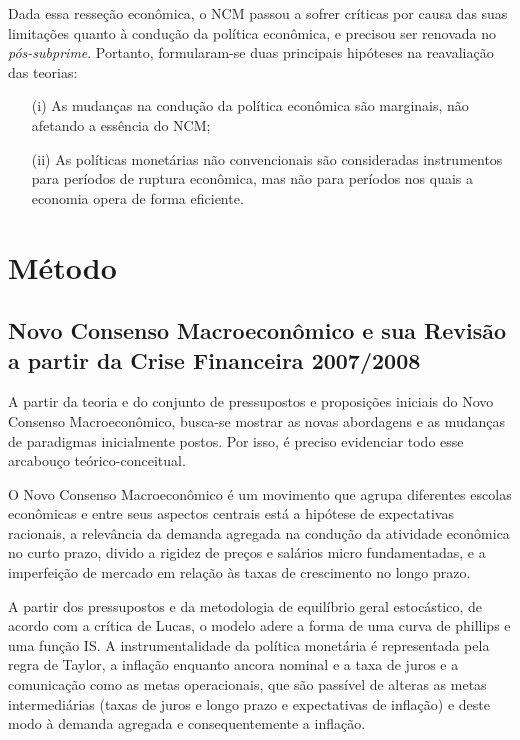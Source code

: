 \documentclass[report]{uftex}
\begin{document}
Dada essa resseção econômica, o NCM passou a sofrer críticas por causa das suas limitações quanto à condução da política econômica, e precisou ser renovada no \textit{pós-subprime}. Portanto, formularam-se duas principais hipóteses na reavaliação das teorias:

\begin{itemize}
\item[(i)] As mudanças na condução da política econômica são marginais, não afetando a essência do NCM;

\item[(ii)] As políticas monetárias não  convencionais são consideradas instrumentos para períodos de ruptura econômica, mas não para períodos nos quais a economia opera de forma eficiente. 	
\end{itemize}

\section{Método}

\subsection{Novo Consenso Macroeconômico e sua Revisão a partir da Crise Financeira 2007/2008}

A partir da teoria e do conjunto de pressupostos e proposições iniciais do Novo Consenso Macroeconômico, busca-se mostrar as novas abordagens e as mudanças de paradigmas inicialmente postos. Por isso, é preciso evidenciar todo esse arcabouço teórico-conceitual. 

O Novo Consenso Macroeconômico é um movimento que agrupa diferentes escolas econômicas e entre seus aspectos centrais está a hipótese de expectativas racionais, a relevância da demanda agregada na condução da atividade econômica no curto prazo, divido a rigidez de preços e salários micro fundamentadas, e a imperfeição de mercado em relação às taxas de crescimento no longo prazo. 

A partir dos pressupostos e da metodologia de equilíbrio geral estocástico, de acordo com a crítica de Lucas, o modelo adere a forma de uma curva de phillips e uma função IS. A instrumentalidade da política monetária é representada pela regra de Taylor, a inflação enquanto ancora nominal e a taxa de juros e a comunicação como as metas operacionais, que são passível de alteras as metas intermediárias (taxas de juros e longo prazo e expectativas de inflação) e deste modo à demanda agregada e consequentemente a inflação. 
\end{document}
